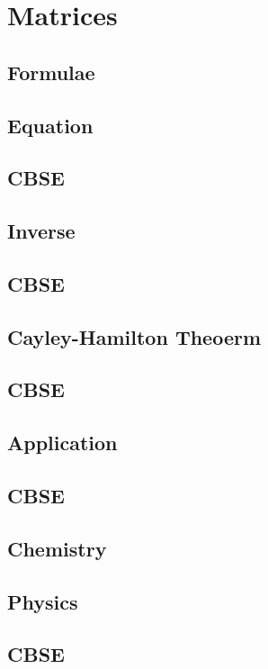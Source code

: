 \documentclass[journal]{IEEEtran}
\begin{document}
	\section{Matrices}
	\subsection{Formulae}
	
	\subsection{Equation}
	
	\subsection{CBSE}
	
	\subsection{Inverse}
	
	\subsection{CBSE}
	
	\subsection{Cayley-Hamilton Theoerm}
	
	\subsection{CBSE}
	
	\subsection{Application}
	
	\subsection{CBSE}
	
	\subsection{Chemistry}
	
	\subsection{Physics}
	
	\subsection{CBSE}
	
\end{document}
